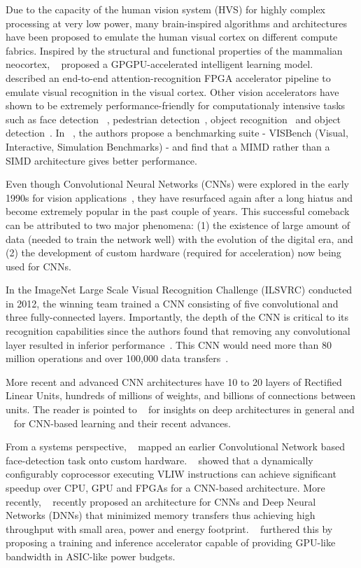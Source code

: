 Due to the capacity of the human vision system (HVS) for highly complex processing at very low power, 
many brain-inspired algorithms and architectures have been proposed to emulate the human visual cortex on different compute fabrics.
Inspired by the structural and functional properties of the mammalian neocortex, ~\cite{Nere2011} proposed a GPGPU-accelerated intelligent learning model.
~\cite{Kestur2011} described an end-to-end attention-recognition FPGA accelerator pipeline to emulate visual recognition in the visual cortex. 
Other vision accelerators have shown to be extremely performance-friendly for computationaly intensive tasks such as 
face detection ~\cite{violafccm}, pedestrian detection~\cite{sips2014}, object recognition~\cite{Maashri2012a} and object detection~\cite{Bae2011}. In ~\cite{micro2008}, the authors propose a benchmarking suite - VISBench (Visual, Interactive, Simulation Benchmarks) - and find that a MIMD rather than a SIMD architecture gives better performance.

Even though Convolutional Neural Networks (CNNs) were explored in the early 1990s for vision applications~\cite{giles1997}, they have resurfaced again after a long hiatus and become extremely popular in the past couple of years. 
This successful comeback can be attributed to two major phenomena:
(1) the existence of large amount of data (needed to train the network well) with the evolution of the digital era, and (2) the development of 
custom hardware (required for acceleration) now being used for CNNs. 

In the ImageNet Large Scale Visual Recognition Challenge (ILSVRC)
conducted in 2012, the winning team trained a CNN consisting of five convolutional and three fully-connected layers. Importantly, the depth of the CNN is critical to 
its recognition capabilities since the authors found that removing any convolutional layer resulted in inferior performance~\cite{NIPS2012}. This CNN would need
more than 80 million operations and over 100,000 data transfers~\cite{XilinxCNN}.

More recent and advanced CNN architectures have 10 to 20 layers of Rectified Linear Units, hundreds of millions of weights, and billions of connections between units.
The reader is pointed to ~\cite{Bengio2009} for insights on deep architectures in general and ~\cite{DNNNature2015} for CNN-based learning and their recent advances. 

From a systems perspective, ~\cite{Farabet2009} mapped an earlier Convolutional Network based face-detection task onto custom hardware. 
~\cite{ISCA2010} showed that a dynamically configurably coprocessor executing VLIW instructions can achieve significant speedup over CPU, GPU and FPGAs for 
a CNN-based architecture. 
More recently, ~\cite{Chen2014} recently proposed an architecture for CNNs and Deep 
Neural Networks (DNNs) that minimized memory transfers thus achieving high
throughput with small area, power and energy footprint. ~\cite{DaDianNao} furthered this by proposing a training and inference accelerator 
capable of providing GPU-like bandwidth in ASIC-like power budgets.
